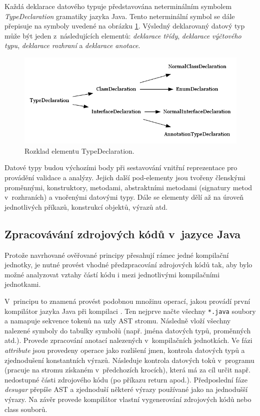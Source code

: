 Každá deklarace datového typuje představována neterminálním symbolem \emph{TypeDeclaration} gramatiky jazyka Java. Tento neterminální symbol se dále přepisuje na symboly uvedené na obrázku \ref{type_declaration_options}. Výsledný deklarovaný datový typ může být jeden z~následujících elementů: \emph{deklarace třídy}, \emph{deklarace výčtového typu}, \emph{deklarace rozhraní} a \emph{deklarace anotace}.

\begin{figure}[h!]
  \centering
  \includegraphics[width=\textwidth]{./graphs/toplevel_types.png}
  \caption{Rozklad elementu TypeDeclaration.\label{type_declaration_options}}
\end{figure}

Datové typy budou výchozími body při sestavování vnitřní reprezentace pro provádění validace a analýzy. Jejich další pod-elementy jsou tvořeny členskými proměnnými, konstruktory, metodami, abstraktními metodami (signatury metod v~rozhraních) a vnořenými datovými typy. Dále se elementy dělí až na úroveň jednotlivých příkazů, konstrukcí objektů, výrazů atd.

\subsection{Zpracovávání zdrojových kódů v~jazyce Java}
\label{analysis-java_source_processing}
Protože navrhované ověřované principy přesahují rámec jedné kompilační jednotky, je nutné provést vhodné předzpracování zdrojových kódů tak, aby bylo možné analyzovat vztahy částí kódu i mezi jednotlivými kompilačními jednotkami.

V~principu to znamená provést podobnou množinu operací, jakou provádí první kompilátor jazyka Java při kompilaci \cite{hackers_guide_to_javac}. Ten nejprve načte všechny \verb+*.java+ soubory a namapuje sekvence tokenů na uzly AST stromu. Následně vloží všechny nalezené symboly do tabulky symbolů (např. jména datových typů, proměnných atd.). Provede zpracování anotací nalezených v~kompilačních jednotkách. Ve fázi \emph{attribute} jsou provedeny operace jako rozlišení jmen, kontrola datových typů a zjednodušení konstantních výrazů. Následuje kontrola datových toků v~programu (pracuje na stromu získaném v~předchozích krocích), která má za cíl určit např. nedostupné části zdrojového kódu (po příkazu return apod.). Předposlední fáze \emph{desugar} přepíše AST a zjednoduší některé výrazy používané jako  na jednodušší výrazy. Na závěr provede kompilátor vlastní vygenerování zdrojových kódů nebo class souborů.

